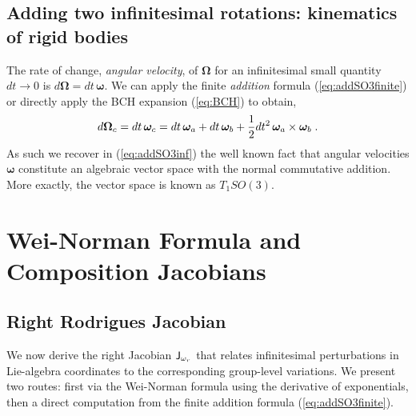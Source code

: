 \documentclass[journal]{IEEEtran}
\newcommand{\bfomega}{\boldsymbol{\omega}}
\newcommand{\bfOmega}{\boldsymbol{\Omega}}
\newcommand{\Jom}{\mathsf{J}_\mathnormal{\omega_r}}
\newcommand{\beq}{\begin{equation}}
\newcommand{\eeq}{\end{equation}}
\begin{document}
\subsection{Adding two infinitesimal rotations: kinematics of rigid bodies}
The rate of change, {\em angular velocity}, of $\bfOmega$ for an infinitesimal small quantity $dt\rightarrow 0$
is $d\bfOmega = dt\, \bfomega$. We can apply the finite {\em addition} formula (\ref{eq:addSO3finite}) or
directly apply the BCH expansion (\ref{eq:BCH}) to obtain,
\beq
    d\bfOmega_c = dt\, \bfomega_c = dt\, \bfomega_a + dt\, \bfomega_b + {1\over 2} dt^2\, \bfomega_a\times\bfomega_b\;.
    \label{eq:addSO3inf}
\eeq
As such we recover in (\ref{eq:addSO3inf}) the well known fact that angular velocities $\bfomega$
constitute an algebraic vector space with the normal commutative addition. More exactly, the
vector space is known as $T_1SO(3)$.

\section{Wei-Norman Formula and Composition Jacobians}
\label{app:weinorman}

\subsection{Right Rodrigues Jacobian}
We now derive the right Jacobian $\Jom$ that relates infinitesimal
perturbations in Lie-algebra coordinates to the corresponding group-level variations.
We present two routes: first via the Wei-Norman formula using the derivative of
exponentials, then a direct computation from the finite addition formula
(\ref{eq:addSO3finite}).
\end{document}
